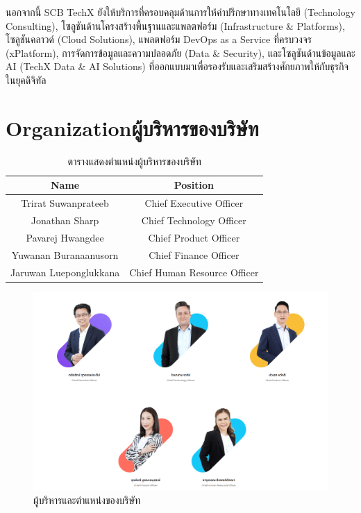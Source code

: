 นอกจากนี้ SCB TechX ยังให้บริการที่ครอบคลุมด้านการให้คำปรึกษาทางเทคโนโลยี (Technology Consulting), โซลูชันด้านโครงสร้างพื้นฐานและแพลตฟอร์ม (Infrastructure \& Platforms), โซลูชันคลาวด์ (Cloud Solutions), แพลตฟอร์ม DevOps as a Service ที่ครบวงจร (xPlatform), การจัดการข้อมูลและความปลอดภัย (Data \& Security), และโซลูชันด้านข้อมูลและ AI (TechX Data \& AI Solutions) ที่ออกแบบมาเพื่อรองรับและเสริมสร้างศักยภาพให้กับธุรกิจในยุคดิจิทัล

\clearpage

\section{\ifenglish Organization\else ผู้บริหารของบริษัท\fi}
\begin{table}[ht]
    \centering
    \begin{tabular}{c||c}
        \textbf{Name}          & \textbf{Position}            \\
        \hline
        \hline
        Trirat Suwanprateeb    & Chief Executive Officer      \\
        Jonathan Sharp         & Chief Technology Officer     \\
        Pavarej Hwangdee       & Chief Product Officer        \\
        Yuwanan Buranaanusorn  & Chief Finance Officer        \\
        Jaruwan Lueponglukkana & Chief Human Resource Officer \\
    \end{tabular}
    \caption{ตารางแสดงตำแหน่งผู้บริหารของบริษัท}
\end{table}
\begin{figure}[ht]
    \begin{center}
        \includegraphics[scale=0.35]{images/org.png}
    \end{center}
    \caption[ผู้บริหารและตำแหน่งของบริษัท]{ผู้บริหารและตำแหน่งของบริษัท}
\end{figure}

